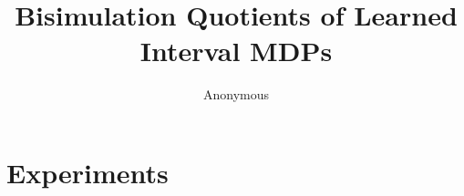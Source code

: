 \documentclass[runningheads]{llncs}
\begin{document}
\title{Bisimulation Quotients of Learned Interval MDPs}
\author{Anonymous}
\maketitle

\section{Experiments}

\newcommand{\imdpfigures}[2]{%
\renewcommand{\imdp}{#1}%
\begin{figure}[t]
    \centering
    \vspace{4mm}%
    \makebox[\linewidth][s]{%
      \statesscatterplot{states}{$\statesinput$}{quotient-states-mdp-exact}{$\statesmdp$}{}{false}\hfill
      \statesscatterplot{states}{$\statesinput$}{quotient-states-\imdp-exact}{$\statesimdp$}{quotient-relation-\imdp-exact}{true}\hfill
      \quotientratioplot{\imdp-exact}{\statesimdp}{false}}

    \medskip

    \makebox[\linewidth][s]{%
      \quotientratioplot{\imdp-0.05}{\statesimdp[0.05]}{false}\hfill
      \quotientratioplot{\imdp-0.1}{\statesimdp[0.1]}{false}\hfill
      \quotientratioplot{\imdp-0.2}{\statesimdp[0.2]}{false}}
    \caption{Number of states of the bisimulation quotients for #2. Top left and middle: the input model ($\statesinput$ states) against
    the quotient of the MDP ($\statesmdp$) and of the learned IMDP ($\statesimdp$).
    Other plots: the MDP quotient against the size of the IMDP quotient relative to it, for exact
    bisimulation and for tolerances $\varepsilon \in \{0.05, 0.1, 0.2\}$; a point $(x,y)$ means that the MDP
    quotient has $x$ states and the IMDP quotient has $x \cdot y$ states.
    The marks tell how the IMDP quotient relates to the MDP quotient.}
    \label{fig:states-#1}
\end{figure}

}
\end{document}
